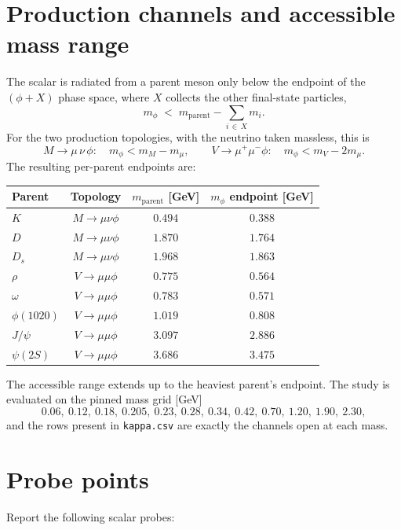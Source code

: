 \documentclass[11pt]{article}
\begin{document}
\section*{Production channels and accessible mass range}

The scalar is radiated from a parent meson only below the endpoint of the
$(\phi + X)$ phase space, where $X$ collects the other final-state particles,
\[
m_\phi \;<\; m_{\text{parent}} - \sum_{i\,\in\,X} m_i .
\]
For the two production topologies, with the neutrino taken massless, this is
\[
M \to \mu\,\nu\,\phi:\quad m_\phi < m_M - m_\mu ,
\qquad
V \to \mu^+\mu^-\phi:\quad m_\phi < m_V - 2 m_\mu .
\]
The resulting per-parent endpoints are:

\begin{center}
\begin{tabular}{@{}lccc@{}}
\toprule
Parent & Topology & $m_{\text{parent}}$ [GeV] & $m_\phi$ endpoint [GeV] \\
\midrule
$K$          & $M\to\mu\nu\phi$ & $0.494$ & $0.388$ \\
$D$          & $M\to\mu\nu\phi$ & $1.870$ & $1.764$ \\
$D_s$        & $M\to\mu\nu\phi$ & $1.968$ & $1.863$ \\
$\rho$       & $V\to\mu\mu\phi$ & $0.775$ & $0.564$ \\
$\omega$     & $V\to\mu\mu\phi$ & $0.783$ & $0.571$ \\
$\phi(1020)$ & $V\to\mu\mu\phi$ & $1.019$ & $0.808$ \\
$J/\psi$     & $V\to\mu\mu\phi$ & $3.097$ & $2.886$ \\
$\psi(2S)$   & $V\to\mu\mu\phi$ & $3.686$ & $3.475$ \\
\bottomrule
\end{tabular}
\end{center}

\noindent
The accessible range extends up to the heaviest parent's endpoint. The study is
evaluated on the pinned mass grid [GeV]
\[
0.06,\ 0.12,\ 0.18,\ 0.205,\ 0.23,\ 0.28,\ 0.34,\ 0.42,\ 0.70,\ 1.20,\ 1.90,\ 2.30,
\]
and the rows present in \texttt{kappa.csv} are exactly the channels open at each
mass.

\section*{Probe points}

Report the following scalar probes:
\end{document}
